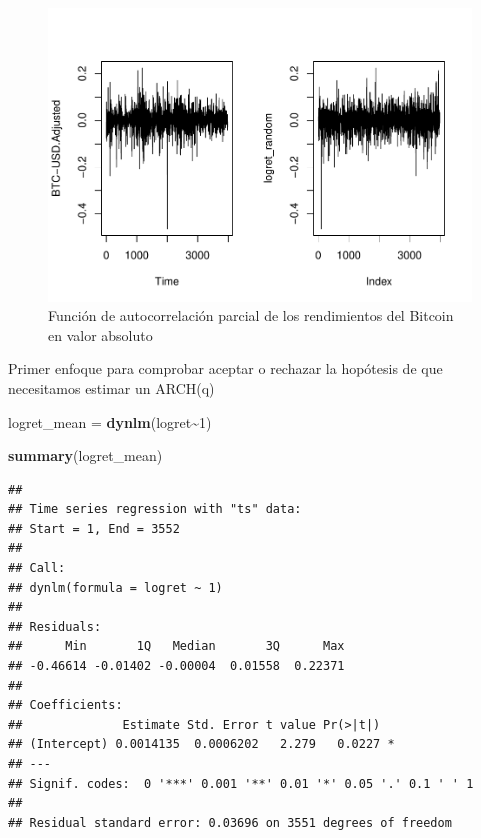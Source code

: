 \documentclass[
]{book}
\newenvironment{Shaded}{\begin{snugshade}}{\end{snugshade}}
\newcommand{\DecValTok}[1]{\textcolor[rgb]{0.00,0.00,0.81}{#1}}
\newcommand{\FunctionTok}[1]{\textcolor[rgb]{0.13,0.29,0.53}{\textbf{#1}}}
\newcommand{\NormalTok}[1]{#1}
\newcommand{\OtherTok}[1]{\textcolor[rgb]{0.56,0.35,0.01}{#1}}
\newcommand{\SpecialCharTok}[1]{\textcolor[rgb]{0.81,0.36,0.00}{\textbf{#1}}}
\begin{document}
\begin{figure}

{\centering \includegraphics{Notas-Series-Tiempo_files/figure-latex/fig109-1} 

}

\caption{Función de autocorrelación parcial de los rendimientos del Bitcoin en valor absoluto}\label{fig:fig109}
\end{figure}

Primer enfoque para comprobar aceptar o rechazar la hopótesis de que necesitamos estimar un ARCH(q)

\begin{Shaded}
\begin{Highlighting}[]
\NormalTok{logret\_mean }\OtherTok{=} \FunctionTok{dynlm}\NormalTok{(logret}\SpecialCharTok{\textasciitilde{}}\DecValTok{1}\NormalTok{)}

\FunctionTok{summary}\NormalTok{(logret\_mean)}
\end{Highlighting}
\end{Shaded}

\begin{verbatim}
## 
## Time series regression with "ts" data:
## Start = 1, End = 3552
## 
## Call:
## dynlm(formula = logret ~ 1)
## 
## Residuals:
##      Min       1Q   Median       3Q      Max 
## -0.46614 -0.01402 -0.00004  0.01558  0.22371 
## 
## Coefficients:
##              Estimate Std. Error t value Pr(>|t|)  
## (Intercept) 0.0014135  0.0006202   2.279   0.0227 *
## ---
## Signif. codes:  0 '***' 0.001 '**' 0.01 '*' 0.05 '.' 0.1 ' ' 1
## 
## Residual standard error: 0.03696 on 3551 degrees of freedom
\end{verbatim}
\end{document}
